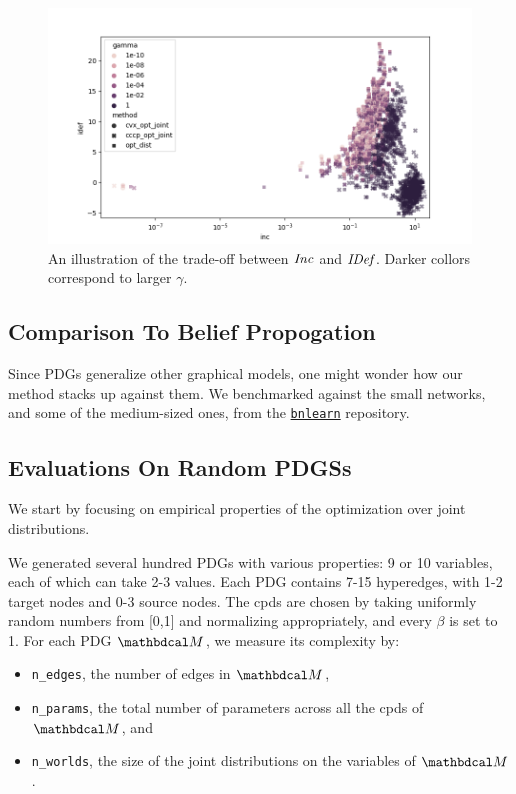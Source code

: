 \documentclass[twoside]{article}
\begin{document}
\begin{figure}
    \includegraphics[width=\linewidth]{figs/inc-idef2}
    \caption{An illustration of the trade-off between $\mathit{Inc}$ and $\mathit{IDef}_{\!}$. Darker collors correspond to larger $\gamma$.}\label{fig:inc-idef}
\end{figure}

\subsection{Comparison To Belief Propogation}

Since PDGs generalize other graphical models, one might wonder how our method stacks up against them. 
We benchmarked against the small networks, and some of the medium-sized ones, from the \href{https://www.bnlearn.com/bnrepository/}{\texttt{bnlearn}} repository. 



\subsection{Evaluations On Random PDGSs}
We start by focusing on empirical properties of the optimization over joint distributions.

We generated several hundred PDGs with various properties: 9 or 10 variables, each of which can take 2-3 values. Each PDG contains 7-15 hyperedges, with 1-2 target nodes and 0-3 source nodes. The cpds are chosen by taking uniformly random numbers from [0,1] and normalizing appropriately, and every $\beta$ is set to 1.
For each PDG $\dg M$, we measure its complexity by:
\begin{itemize}[nosep]
    \item \texttt{n\_edges}, the number of edges in $\dg M$,
    \item \texttt{n\_params}, the total number of parameters across all the cpds of $\dg M$, and
    \item \texttt{n\_worlds}, the size of the joint distributions on the variables of $\dg M$.
\end{itemize}
\end{document}
